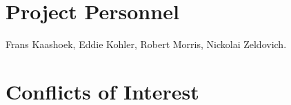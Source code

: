 \section*{Project Personnel}

Frans Kaashoek,
Eddie Kohler,
Robert Morris,
Nickolai Zeldovich.

\section*{Conflicts of Interest}
